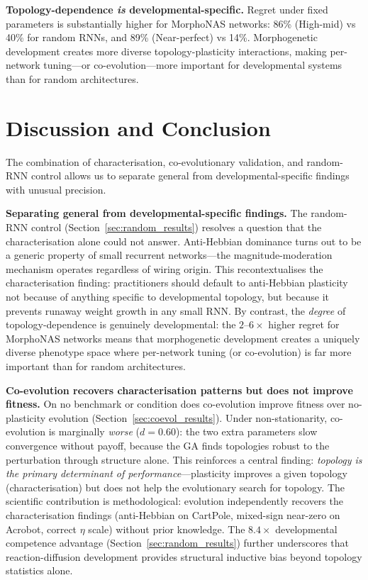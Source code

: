 \documentclass[sigconf,nonacm]{acmart}
\begin{document}
\textbf{Topology-dependence \emph{is} developmental-specific.} Regret under fixed parameters is substantially higher for MorphoNAS networks: 86\% (High-mid) vs 40\% for random RNNs, and 89\% (Near-perfect) vs 14\%. Morphogenetic development creates more diverse topology-plasticity interactions, making per-network tuning---or co-evolution---more important for developmental systems than for random architectures.

\section{Discussion and Conclusion}
\label{sec:discussion}

The combination of characterisation, co-evolutionary validation, and random-RNN control allows us to separate general from deve\-lopmental-specific findings with unusual precision.

\textbf{Separating general from developmental-specific findings.} The random-RNN control (Section~\ref{sec:random_results}) resolves a question that the characterisation alone could not answer. Anti-Hebbian dominance turns out to be a generic property of small recurrent networks---the magnitude-moderation mechanism operates regardless of wiring origin. This recontextualises the characterisation finding: practitioners should default to anti-Hebbian plasticity not because of anything specific to developmental topology, but because it prevents runaway weight growth in any small RNN. By contrast, the \emph{degree} of topology-dependence is genuinely developmental: the $2$--$6\times$ higher regret for MorphoNAS networks means that morphogenetic development creates a uniquely diverse phenotype space where per-network tuning (or co-evolution) is far more important than for random architectures.

\textbf{Co-evolution recovers characterisation patterns but does not improve fitness.} On no benchmark or condition does co-evolution improve fitness over no-plasticity evolution (Section~\ref{sec:coevol_results}). Under non-stationarity, co-evolution is marginally \emph{worse} ($d = 0.60$): the two extra parameters slow convergence without payoff, because the GA finds topologies robust to the perturbation through structure alone. This reinforces a central finding: \emph{topology is the primary determinant of performance}---plasticity improves a given topology (characterisation) but does not help the evolutionary search for topology. The scientific contribution is methodological: evolution independently recovers the characterisation findings (anti-Hebbian on CartPole, mixed-sign near-zero on Acrobot, correct $\eta$ scale) without prior knowledge. The $8.4\times$ developmental competence advantage (Section~\ref{sec:random_results}) further underscores that reaction-diffusion development provides structural inductive bias beyond topology statistics alone.
\end{document}
